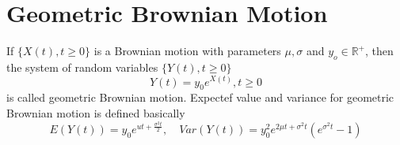 \documentclass[a4paper]{article}
\begin{document}
\section{Geometric Brownian Motion}
If $\{ X(t), t\geq 0\}$ is a Brownian motion with parameters $\mu, \sigma$ and $y_o \in \mathbb{R} ^ +$, then the system of random variables $\{ Y(t), t\geq 0\}$
\begin{equation}
    Y(t) = y_0 e^{X(t)}, t \geq 0
\end{equation}
is called geometric Brownian motion. Expectef value and variance for geometric Brownian motion is defined basically
\begin{equation}
    E(Y(t)) = y_0 e^{ut + \frac{\sigma ^ 2 t}{2}}, \quad Var(Y(t)) = y_0 ^ {2} e ^ {2 \mu t + \sigma^2 t} ( e ^ {\sigma ^ 2 t} - 1)
\end{equation}
\end{document}
